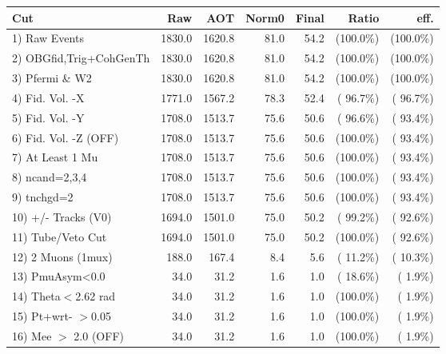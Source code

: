  \begin{table}[h!]\centering
 \begin{tabular}{||l||r|r|r|r|r|r||}
 \hline
 \hline
 Cut & Raw & AOT & Norm0 & Final & Ratio & eff.       \\
 \hline
  1) Raw Events           &       1830.0 &       1620.8 &         81.0 &         54.2 & (100.0\%) & (100.0\%) \\
  2) OBGfid,Trig+CohGenTh &       1830.0 &       1620.8 &         81.0 &         54.2 & (100.0\%) & (100.0\%) \\
  3) Pfermi \& W2         &       1830.0 &       1620.8 &         81.0 &         54.2 & (100.0\%) & (100.0\%) \\
  4) Fid. Vol. -X         &       1771.0 &       1567.2 &         78.3 &         52.4 & ( 96.7\%) & ( 96.7\%) \\
  5) Fid. Vol. -Y         &       1708.0 &       1513.7 &         75.6 &         50.6 & ( 96.6\%) & ( 93.4\%) \\
  6) Fid. Vol. -Z (OFF)   &       1708.0 &       1513.7 &         75.6 &         50.6 & (100.0\%) & ( 93.4\%) \\
  7) At Least 1 Mu        &       1708.0 &       1513.7 &         75.6 &         50.6 & (100.0\%) & ( 93.4\%) \\
  8) ncand=2,3,4          &       1708.0 &       1513.7 &         75.6 &         50.6 & (100.0\%) & ( 93.4\%) \\
  9) tnchgd=2             &       1708.0 &       1513.7 &         75.6 &         50.6 & (100.0\%) & ( 93.4\%) \\
 10) +/- Tracks (V0)      &       1694.0 &       1501.0 &         75.0 &         50.2 & ( 99.2\%) & ( 92.6\%) \\
 11) Tube/Veto Cut        &       1694.0 &       1501.0 &         75.0 &         50.2 & (100.0\%) & ( 92.6\%) \\
 12) 2 Muons (1mux)       &        188.0 &        167.4 &          8.4 &          5.6 & ( 11.2\%) & ( 10.3\%) \\
 13) PmuAsym<0.0          &         34.0 &         31.2 &          1.6 &          1.0 & ( 18.6\%) & (  1.9\%) \\
 14) Theta$<$2.62 rad     &         34.0 &         31.2 &          1.6 &          1.0 & (100.0\%) & (  1.9\%) \\
 15) Pt+wrt- $>$0.05      &         34.0 &         31.2 &          1.6 &          1.0 & (100.0\%) & (  1.9\%) \\
 16) Mee $>$ 2.0  (OFF)   &         34.0 &         31.2 &          1.6 &          1.0 & (100.0\%) & (  1.9\%) \\

\end{tabular}
\end{table}
